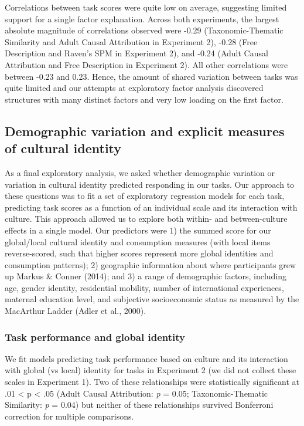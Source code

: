 \documentclass[
  man,floatsintext]{apa6}
\begin{document}
Correlations between task scores were quite low on average, suggesting limited support for a single factor explanation. Across both experiments, the largest absolute magnitude of correlations observed were -0.29 (Taxonomic-Thematic Similarity and Adult Causal Attribution in Experiment 2), -0.28 (Free Description and Raven's SPM in Experiment 2), and -0.24 (Adult Causal Attribution and Free Description in Experiment 2). All other correlations were between -0.23 and 0.23. Hence, the amount of shared variation between tasks was quite limited and our attempts at exploratory factor analysis discovered structures with many distinct factors and very low loading on the first factor.

\hypertarget{demographic-variation-and-explicit-measures-of-cultural-identity}{%
\subsection{Demographic variation and explicit measures of cultural identity}\label{demographic-variation-and-explicit-measures-of-cultural-identity}}

As a final exploratory analysis, we asked whether demographic variation or variation in cultural identity predicted responding in our tasks. Our approach to these questions was to fit a set of exploratory regression models for each task, predicting task scores as a function of an individual scale and its interaction with culture. This approach allowed us to explore both within- and between-culture effects in a single model. Our predictors were 1) the summed score for our global/local cultural identity and consumption measures (with local items reverse-scored, such that higher scores represent more global identities and consumption patterns); 2) geographic information about where participants grew up Markus \& Conner (2014); and 3) a range of demographic factors, including age, gender identity, residential mobility, number of international experiences, maternal education level, and subjective socioeconomic status as measured by the MacArthur Ladder (Adler et al., 2000).

\hypertarget{task-performance-and-global-identity}{%
\subsubsection{Task performance and global identity}\label{task-performance-and-global-identity}}

We fit models predicting task performance based on culture and its interaction with global (vs local) identity for tasks in Experiment 2 (we did not collect these scales in Experiment 1). Two of these relationships were statistically significant at .01 \textless{} p \textless{} .05 (Adult Causal Attribution: \emph{p} = 0.05; Taxonomic-Thematic Similarity: \emph{p} = 0.04) but neither of these relationships survived Bonferroni correction for multiple comparisons.
\end{document}

